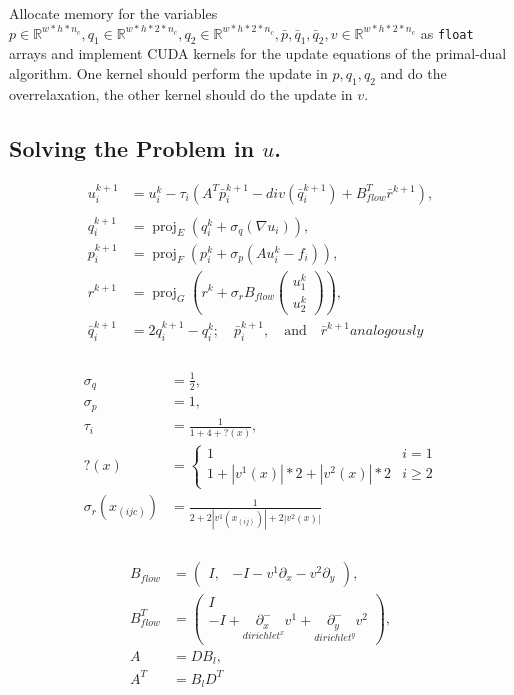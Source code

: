 \documentclass[A4,12pt]{article}
\DeclareMathOperator*{\proj}{proj}
\newcommand{\R}{\mathbb{R}}
\begin{document}
Allocate memory for the variables $p \in \R^{w*h*n_c},q_1 \in \R^{w*h*2*n_c},q_2 \in \R^{w*h*2*n_c},\bar p, \bar q_1, \bar q_2, v \in \R^{w*h*2*n_c}$ as {\tt float} arrays and implement CUDA kernels for the update equations of the primal-dual algorithm. One kernel should perform the update in $p, q_1, q_2$ and do the overrelaxation, the other kernel should do the update in $v$. 

\subsection{Solving the Problem in $u$.}
\begin{equation}
\begin{aligned}
u_i^{k+1}&=u_i^k-\tau_i(A^T\bar p_i^{k+1}-div(\bar q_i^{k+1})+B_{flow}^T\bar r^{k+1}) , \\
\\
q_i^{k+1}&=\proj_E(q_i^k + \sigma_q (\nabla u_i)), \\
p_i^{k+1}&=\proj_F(p_i^k + \sigma_p (Au_i^k - f_i)), \\
r^{k+1}&=\proj_G(r^{k} + \sigma_r B_{flow}\begin{pmatrix}u_1^k \\ u_2^k\end{pmatrix}), \\
\bar q_i^{k+1}&=2q_i^{k+1}-q_i^k; \quad \bar p_i^{k+1},\quad \textrm{and} \quad \bar r^{k+1} analogously \\
\end{aligned}
\end{equation}
\\
\begin{equation}
\begin{aligned}
\sigma_q &= \frac{1}{2}, \\
\sigma_p &= 1, \\
\tau_i&=\frac{1}{1+4+?(x)}, \\
?(x)&=\begin{cases} 1 & i=1 \\ 1+|v^1(x)|*2+|v^2(x)|*2 & i \geq 2 \end{cases} \\
\sigma_r (x_{(ijc)}) &= \frac{1}{2+2|v^1(x_{(ij)})|+2|v^2(x)|} \\
\end{aligned}
\end{equation}
\\
\begin{equation}
\begin{aligned}
B_{flow}&=\begin{pmatrix}I, &-I-v^1\partial_x-v^2\partial_y\end{pmatrix}, \\
B_{flow}^T&=\begin{pmatrix}I \\ -I+\underset{dirichlet^x} {\partial^-_x} v^1+\underset{dirichlet^y} {\partial^-_y} v^2\end{pmatrix}, \\
A&=DB_l, \\
A^T&=B_lD^T \\
\end{aligned}
\end{equation}
\end{document}
